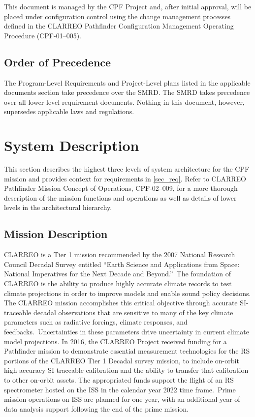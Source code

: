 This document is managed by the \gls{CPF} Project and, after initial approval, will be placed under configuration control using the change management processes defined in the \gls{CLARREO} Pathfinder Configuration Management Operating Procedure (CPF-01--005).

\section{Order of Precedence }
\label{orderofprecedence}

The Program-Level Requirements and Project-Level plans listed in the applicable documents section take precedence over the \gls{SMRD}. The \gls{SMRD} takes precedence over all lower level requirement documents. Nothing in this document, however, supersedes applicable laws and regulations.

\chapter{System Description  }
\label{sec_desc}

This section describes the highest three levels of system architecture for the \gls{CPF} mission and provides context for requirements in \autoref{sec_req}. Refer to \gls{CLARREO} Pathfinder Mission Concept of Operations, \gls{CPF}-02--009, for a more thorough description of the mission functions and operations as well as details of lower levels in the architectural hierarchy.

\section{Mission Description }
\label{missiondescription}

\gls{CLARREO} is a Tier 1 mission recommended by the 2007 National Research Council Decadal Survey entitled ``Earth Science and Applications from Space: National Imperatives for the Next Decade and Beyond.'' The foundation of \gls{CLARREO} is the ability to produce highly accurate climate records to \gls{test} climate projections in order to improve models and enable sound policy decisions. The \gls{CLARREO} mission accomplishes this critical objective through accurate \gls{SI}-traceable decadal observations that are sensitive to many of the key climate parameters such as radiative forcings, climate responses, and feedbacks. Uncertainties in these parameters drive uncertainty in current climate model projections. In 2016, the \gls{CLARREO} Project received funding for a Pathfinder mission to demonstrate essential \gls{measure}ment technologies for the \gls{RS} portions of the \gls{CLARREO} Tier 1 Decadal survey mission, to include on-orbit high accuracy \gls{SI}-traceable calibration and the ability to transfer that calibration to other on-orbit assets. The appropriated funds support the flight of an \gls{RS} spectrometer hosted on the \gls{ISS} in the calendar year 2022 time frame. Prime mission operations on \gls{ISS} are planned for one year, with an additional year of data \gls{analysis} support following the end of the prime mission.

